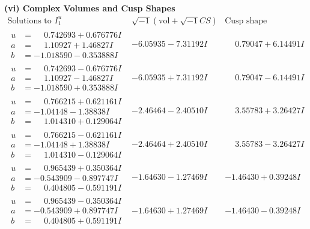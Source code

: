 \documentclass[1p]{elsarticle_modified}
\theoremstyle{definition}
\newcommand{\I}{\sqrt{-1}}
\begin{document}
\newpage\flushleft \textbf{(vi) Complex Volumes and Cusp Shapes}
$$\begin{array}{c|c|c}  
\text{Solutions to }I^u_{1}& \I (\text{vol} + \sqrt{-1}CS) & \text{Cusp shape}\\
 \hline 
\begin{aligned}
u &= \phantom{-}0.742693 + 0.676776 I \\
a &= \phantom{-}1.10927 + 1.46827 I \\
b &= -1.018590 - 0.353888 I\end{aligned}
 & -6.05935 - 7.31192 I & \phantom{-}0.79047 + 6.14491 I \\ \hline\begin{aligned}
u &= \phantom{-}0.742693 - 0.676776 I \\
a &= \phantom{-}1.10927 - 1.46827 I \\
b &= -1.018590 + 0.353888 I\end{aligned}
 & -6.05935 + 7.31192 I & \phantom{-}0.79047 - 6.14491 I \\ \hline\begin{aligned}
u &= \phantom{-}0.766215 + 0.621161 I \\
a &= -1.04148 - 1.38838 I \\
b &= \phantom{-}1.014310 + 0.129064 I\end{aligned}
 & -2.46464 - 2.40510 I & \phantom{-}3.55783 + 3.26427 I \\ \hline\begin{aligned}
u &= \phantom{-}0.766215 - 0.621161 I \\
a &= -1.04148 + 1.38838 I \\
b &= \phantom{-}1.014310 - 0.129064 I\end{aligned}
 & -2.46464 + 2.40510 I & \phantom{-}3.55783 - 3.26427 I \\ \hline\begin{aligned}
u &= \phantom{-}0.965439 + 0.350364 I \\
a &= -0.543909 - 0.897747 I \\
b &= \phantom{-}0.404805 - 0.591191 I\end{aligned}
 & -1.64630 - 1.27469 I & -1.46430 + 0.39248 I \\ \hline\begin{aligned}
u &= \phantom{-}0.965439 - 0.350364 I \\
a &= -0.543909 + 0.897747 I \\
b &= \phantom{-}0.404805 + 0.591191 I\end{aligned}
 & -1.64630 + 1.27469 I & -1.46430 - 0.39248 I \\ \hline\begin{aligned}

\end{aligned}
\end{array}$$
\end{document}
